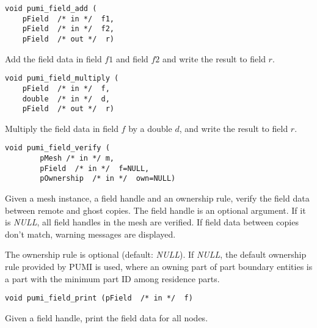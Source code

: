 \begin{verbatim}
void pumi_field_add (
    pField  /* in */  f1,
    pField  /* in */  f2,
    pField  /* out */  r)
\end{verbatim}\vspace{-.5cm}\hspace{1cm}
Add the field data in field $f1$ and field $f2$ and write the result to field $r$.

\begin{verbatim}
void pumi_field_multiply (
    pField  /* in */  f,
    double  /* in */  d,
    pField  /* out */  r)
\end{verbatim}\vspace{-.5cm}\hspace{1cm}
Multiply the field data in field $f$ by a double $d$, and write the result to field $r$.

\begin{verbatim}
void pumi_field_verify (
        pMesh /* in */ m, 
        pField  /* in */  f=NULL, 
        pOwnership  /* in */  own=NULL)
\end{verbatim}\vspace{-.5cm}\hspace{1cm}
Given a mesh instance, a field handle and an ownership rule, verify the field data between remote and ghost copies. The field handle is an optional argument. If it is \emph{NULL}, all field handles in the mesh are verified. If field data between copies don't match, warning messages are displayed. 

The ownership rule is optional (default: \emph{NULL}). If \emph{NULL}, the default ownership rule provided by PUMI is used, where an owning part of part boundary entities is a part with the minimum part ID among residence parts.

\begin{verbatim}
void pumi_field_print (pField  /* in */  f)
\end{verbatim}\vspace{-.5cm}\hspace{1cm}
Given a field handle, print the field data for all nodes.
